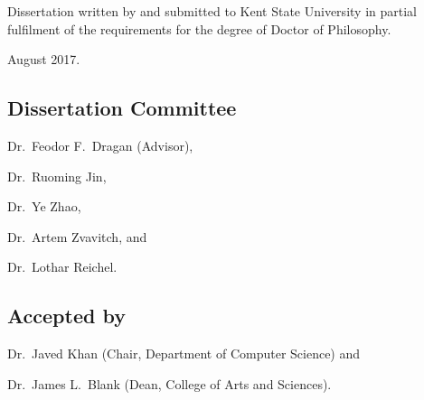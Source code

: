 \clearpage
\makeatletter

\noindent
Dissertation written by \@author and submitted to Kent State University in partial fulfilment of the requirements for the degree of Doctor of Philosophy.

\bigskip

\noindent
August 2017.

\subsection*{Dissertation Committee}
\begin{trivlist}
    \item
        Dr.\ Feodor F.\ Dragan (Advisor),
    \item
        Dr.\ Ruoming Jin,
    \item
        Dr.\ Ye Zhao,
    \item
        Dr.\ Artem Zvavitch, and
    \item
        Dr.\ Lothar Reichel.
\end{trivlist}

\subsection*{Accepted by}
\begin{trivlist}
    \item
        Dr.\ Javed Khan (Chair, Department of Computer Science) and
    \item
        Dr.\ James L.\ Blank (Dean, College of Arts and Sciences).
\end{trivlist}

\makeatother
\clearpage
